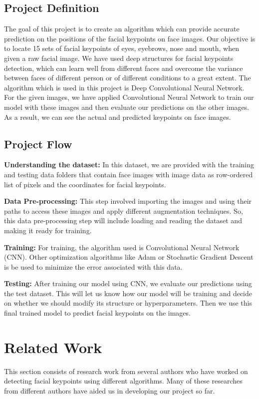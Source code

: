 \documentclass[conference]{IEEEtran}
\begin{document}
\subsection{Project Definition}
The goal of this project is to create an algorithm which can provide accurate prediction on the positions of the facial keypoints on face images. Our objective is to locate 15 sets of facial keypoints of eyes, eyebrows, nose and mouth, when given a raw facial image. We have used deep structures for facial keypoints detection, which can learn well from different faces and overcome the variance between faces of different person or of different conditions to a great extent. The algorithm which is used in this project is Deep Convolutional Neural Network. For the given images, we have applied Convolutional Neural Network to train our model with these images and then evaluate our predictions on the other images. As a result, we can see the actual and predicted keypoints on face images.

\subsection{Project Flow}


\textbf{Understanding the dataset:} In this dataset, we are provided with the training and testing data folders that contain face images with image data as row-ordered list of pixels and the coordinates for facial keypoints.
    
\textbf{Data Pre-processing:} This step involved importing the images and using their paths to access these images and apply different augmentation techniques. So, this data pre-processing step will include loading and reading the dataset and making it ready for training.
    
\textbf{Training:} For training, the algorithm used is Convolutional Neural Network (CNN). Other optimization algorithms like Adam or Stochastic Gradient Descent is be used to minimize the error associated with this data.
    
\textbf{Testing:} After training our model using CNN, we evaluate our predictions using the test dataset. This will let us know how our model will be training and decide on whether we should modify its structure or hyperparameters. Then we use this final trained model to predict facial keypoints on the images.



\section{Related Work}
This section consists of research work from several authors who have worked on detecting facial keypoints using different algorithms. Many of these researches from different authors have aided us in developing our project so far. 
\end{document}
